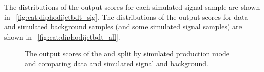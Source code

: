 The distributions of the \DiPhoDiJetBdt output scores for each simulated signal sample are shown in \Fig~\ref{fig:cat:diphodijetbdt_sig}. The distributions of the \DiJetBdt output scores for data and simulated background samples (and some simulated signal samples) are shown in \Fig~\ref{fig:cat:diphodijetbdt_all}. 

\begin{figure}[h]
\centering
\caption{The output scores of the \DiJetBdt and \DiPhoDiJetBdt split by simulated production mode and comparing data and simulated signal and background.}
\label{fig:cat:vbf_bdts}
\end{figure}

